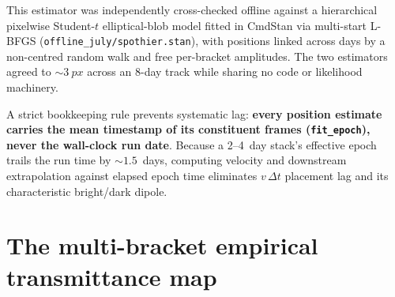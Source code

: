 \documentclass[11pt,a4paper]{article}
\newcommand{\code}[1]{\texttt{\small #1}}
\begin{document}
This estimator was independently cross-checked offline against a hierarchical pixelwise
Student-$t$ elliptical-blob model fitted in CmdStan via multi-start L-BFGS
\citep{liu1989lbfgs,papaspiliopoulos2007parametrization,betancourt2015hmc,gelman2020workflow}
(\code{offline\_july/\allowbreak spothier.stan}), with positions linked across days by a
non-centred random walk and free per-bracket amplitudes. The two estimators agreed to
$\sim\SI{3}{px}$ across an 8-day track while sharing no code or likelihood machinery.

A strict bookkeeping rule prevents systematic lag: \textbf{every position estimate
carries the mean timestamp of its constituent frames (\code{fit\_epoch}), never the
wall-clock run date}. Because a 2--4~day stack's effective epoch trails the run time by
$\sim 1.5$~days, computing velocity and downstream extrapolation against elapsed epoch
time eliminates $v\,\Delta t$ placement lag and its characteristic bright/dark dipole.

\section{The multi-bracket empirical transmittance map}
\label{sec:map}
\end{document}
